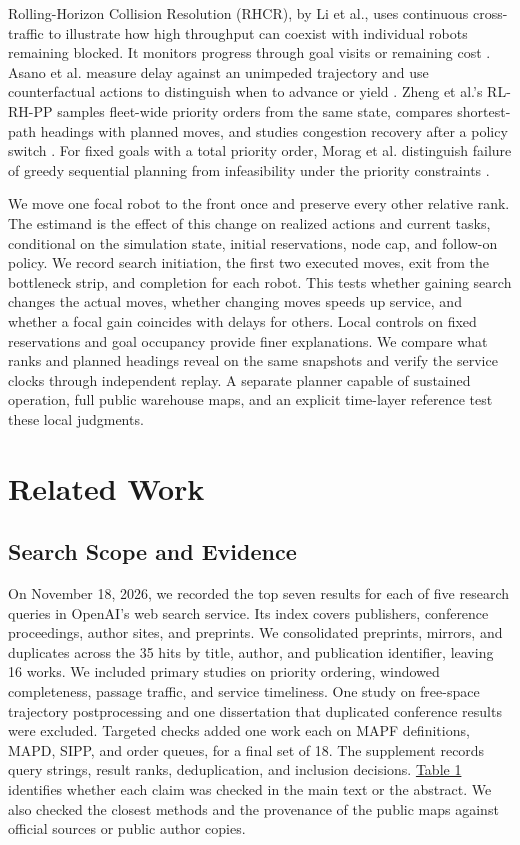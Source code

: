 \documentclass{article}
\begin{document}
Rolling-Horizon Collision Resolution (RHCR), by Li et al., uses continuous cross-traffic to illustrate how high throughput can coexist with individual robots remaining blocked. It monitors progress through goal visits or remaining cost \citep{li2021}. Asano et al. measure delay against an unimpeded trajectory and use counterfactual actions to distinguish when to advance or yield \citep{asano2023}. Zheng et al.'s RL-RH-PP samples fleet-wide priority orders from the same state, compares shortest-path headings with planned moves, and studies congestion recovery after a policy switch \citep[Sec.~6]{zheng2026}. For fixed goals with a total priority order, Morag et al. distinguish failure of greedy sequential planning from infeasibility under the priority constraints \citep{morag2024}.

We move one focal robot to the front once and preserve every other relative rank. The estimand is the effect of this change on realized actions and current tasks, conditional on the simulation state, initial reservations, node cap, and follow-on policy. We record search initiation, the first two executed moves, exit from the bottleneck strip, and completion for each robot. This tests whether gaining search changes the actual moves, whether changing moves speeds up service, and whether a focal gain coincides with delays for others. Local controls on fixed reservations and goal occupancy provide finer explanations. We compare what ranks and planned headings reveal on the same snapshots and verify the service clocks through independent replay. A separate planner capable of sustained operation, full public warehouse maps, and an explicit time-layer reference test these local judgments.

\section{Related Work}
\subsection{Search Scope and Evidence}
On November 18, 2026, we recorded the top seven results for each of five research queries in OpenAI's web search service. Its index covers publishers, conference proceedings, author sites, and preprints. We consolidated preprints, mirrors, and duplicates across the 35 hits by title, author, and publication identifier, leaving 16 works. We included primary studies on priority ordering, windowed completeness, passage traffic, and service timeliness. One study on free-space trajectory postprocessing and one dissertation that duplicated conference results were excluded. Targeted checks added one work each on MAPF definitions, MAPD, SIPP, and order queues, for a final set of 18. The supplement records query strings, result ranks, deduplication, and inclusion decisions. \hyperlink{display:Table1}{Table 1} identifies whether each claim was checked in the main text or the abstract. We also checked the closest methods and the provenance of the public maps against official sources or public author copies.
\end{document}

